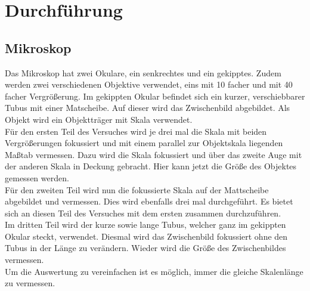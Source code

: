 \documentclass[12pt,a4paper,titlepage,headinclude]{scrartcl}
\numberwithin{equation}{subsection}
\begin{document}
\section{Durchführung}
\label{sec:durchfuehrung}

\subsection{Mikroskop}
Das Mikroskop hat zwei Okulare, ein senkrechtes und ein gekipptes.
Zudem werden zwei verschiedenen Objektive verwendet, eins mit 10 facher und mit 40 facher Vergrößerung.
Im gekippten Okular befindet sich ein kurzer, verschiebbarer Tubus mit einer Matscheibe.
Auf dieser wird das Zwischenbild abgebildet.
Als Objekt wird ein Objektträger mit Skala verwendet.\\
Für den ersten Teil des Versuches wird je drei mal die Skala mit beiden Vergrößerungen fokussiert und mit einem parallel zur Objektskala liegenden Maßtab vermessen.
Dazu wird die Skala fokussiert und über das zweite Auge mit der anderen Skala in Deckung gebracht.
Hier kann jetzt die Größe des Objektes gemessen werden.\\
Für den zweiten Teil wird nun die fokussierte Skala auf der Mattscheibe abgebildet und vermessen.
Dies wird ebenfalls drei mal durchgeführt.
Es bietet sich an diesen Teil des Versuches mit dem ersten zusammen durchzuführen.\\
Im dritten Teil wird der kurze sowie lange Tubus, welcher ganz im gekippten Okular steckt, verwendet.
Diesmal wird das Zwischenbild fokussiert ohne den Tubus in der Länge zu verändern.
Wieder wird die Größe des Zwischenbildes vermessen.\\
Um die Auswertung zu vereinfachen ist es möglich, immer die gleiche Skalenlänge zu vermessen.
\end{document}
